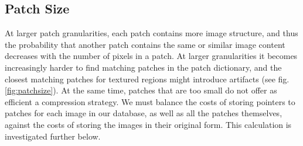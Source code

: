 

\subsection{Patch Size}
\label{sec:patchsize}



At larger patch granularities, each patch contains more image structure, and thus the probability that another patch contains the same or similar image content decreases with the number of pixels in a patch. At larger granularities it becomes increasingly harder to find matching patches in the patch dictionary, and the closest matching patches for textured regions might introduce artifacts (see fig.\ref{fig:patchsize}). At the same time, patches that are too small do not offer as efficient a compression strategy. We must balance the costs of storing pointers to patches for each image in our database, as well as all the patches themselves, against the costs of storing the images in their original form. This calculation is investigated further below.


